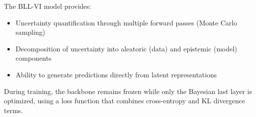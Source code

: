 \documentclass{article}
\begin{document}
The BLL-VI model provides:
\begin{itemize}
    \item Uncertainty quantification through multiple forward passes (Monte Carlo sampling)
    \item Decomposition of uncertainty into aleatoric (data) and epistemic (model) components
    \item Ability to generate predictions directly from latent representations
\end{itemize}

During training, the backbone remains frozen while only the Bayesian last layer is optimized, using a loss function that combines cross-entropy and KL divergence terms.


\end{document}

